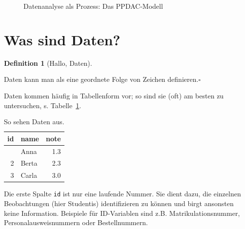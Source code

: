 \documentclass[
  a4paper,
  DIV=11]{scrreprt}
\theoremstyle{definition}
\theoremstyle{definition}
\theoremstyle{definition}
\newtheorem{definition}{Definition}[chapter]
\theoremstyle{remark}
\begin{document}
\begin{figure}


\caption{\label{fig-ppdac}Datenanalyse als Prozess: Das PPDAC-Modell}

\end{figure}%

\section{Was sind Daten?}\label{was-sind-daten}

\begin{definition}[Hallo,
Daten]\protect\hypertarget{def-daten}{}\label{def-daten}

Daten kann man als eine geordnete Folge von Zeichen
definieren.\(\square\)

\end{definition}

Daten kommen häufig in Tabellenform vor; so sind sie (oft) am besten zu
untersuchen, s. Tabelle~\ref{tbl-daten}.

\begin{longtable}{rlr}

\caption{\label{tbl-daten}So sehen Daten aus.}

\tabularnewline

\toprule
id & name & note \\ 
\midrule\addlinespace[2.5pt]
1 & Anna & 1.3 \\ 
2 & Berta & 2.3 \\ 
3 & Carla & 3.0 \\ 
\bottomrule

\end{longtable}

Die erste Spalte \texttt{id} ist nur eine laufende Nummer. Sie dient
dazu, die einzelnen Beobachtungen (hier Studentis) identifizieren zu
können und birgt ansonsten keine Information. Beispiele für ID-Variablen
sind z.B. Matrikulationsnummer, Personalausweisnummern oder
Bestellnummern.
\end{document}
